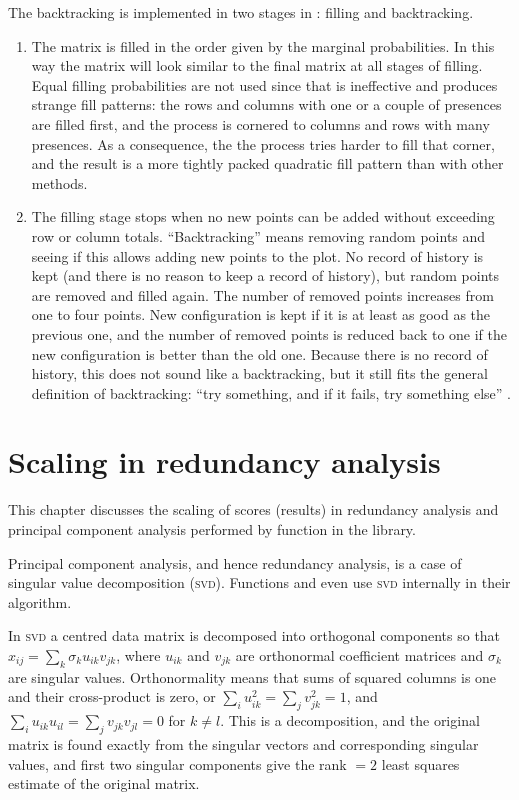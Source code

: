 \documentclass[article,nojss]{jss}
\begin{document}
The backtracking is implemented in two stages in : filling and
backtracking.
\begin{enumerate}
  \item The matrix is filled in the order given by the marginal
    probabilities. In this way the matrix will look similar to the
    final matrix at all stages of filling. Equal filling probabilities
    are not used since that is ineffective and produces strange fill
    patterns: the rows and columns with one or a couple of presences
    are filled first, and the process is cornered to columns and
    rows with many presences. As a consequence, the the process tries
    harder to fill that corner, and the result is a more tightly
    packed quadratic fill pattern than with other methods.
  \item The filling stage stops when no new points can be added
    without exceeding row or column totals. ``Backtracking'' means
    removing random points and seeing if this allows adding new points
    to the plot. No record of history is kept (and there is no reason
    to keep a record of history), but random points are removed and
    filled again. The number of removed points increases from one to
    four points. New configuration is kept if it is at least as good
    as the previous one, and the number of removed points is reduced
    back to one if the new configuration is better than the old one.
    Because there is no record of history, this does not sound like a
    backtracking, but it still fits the general definition of
    backtracking: ``try something, and if it fails, try something
    else'' \citep{Sedgewick90}.
\end{enumerate}


\section{Scaling in redundancy analysis}

This chapter discusses the scaling of scores (results) in redundancy
analysis and principal component analysis performed by function
 in the  library.  

Principal component analysis, and hence redundancy analysis, is a case
of singular value decomposition (\textsc{svd}).  Functions
 and  even use \textsc{svd} internally in
their algorithm.

In \textsc{svd} a centred data matrix is decomposed into orthogonal
components so that $x_{ij} = \sum_k \sigma_k u_{ik} v_{jk}$, where
$u_{ik}$ and $v_{jk}$ are orthonormal coefficient matrices and
$\sigma_k$ are singular values.  Orthonormality means that sums of
squared columns is one and their cross-product is zero, or $\sum_i
u_{ik}^2 = \sum_j v_{jk}^2 = 1$, and $\sum_i u_{ik} u_{il} = \sum_j
v_{jk} v_{jl} = 0$ for $k \neq l$. This is a decomposition, and the
original matrix is found exactly from the singular vectors and
corresponding singular values, and first two singular components give
the rank $=2$ least squares estimate of the original matrix.
\end{document}
